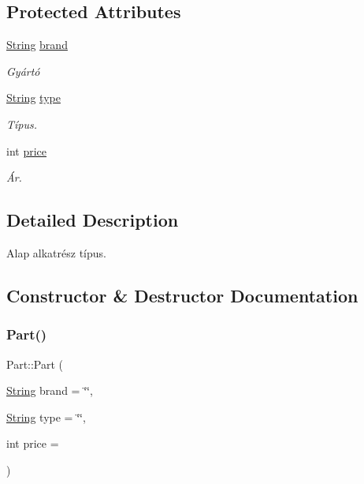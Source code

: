 \subsection*{Protected Attributes}
\begin{DoxyCompactItemize}
\item 
\mbox{\hyperlink{class_string}{String}} \mbox{\hyperlink{class_part_ae06f2fdeb7fbbdb229a7aca151f3e341}{brand}}
\begin{DoxyCompactList}\small\item\em Gyártó \end{DoxyCompactList}\item 
\mbox{\hyperlink{class_string}{String}} \mbox{\hyperlink{class_part_a101dbcc5c4b21564df7414c7eb0eae88}{type}}
\begin{DoxyCompactList}\small\item\em Típus. \end{DoxyCompactList}\item 
int \mbox{\hyperlink{class_part_a8e71223aed1da95a974f33d8d6c91bb1}{price}}
\begin{DoxyCompactList}\small\item\em Ár. \end{DoxyCompactList}\end{DoxyCompactItemize}


\subsection{Detailed Description}
Alap alkatrész típus. 

\subsection{Constructor \& Destructor Documentation}
\mbox{\label{class_part_aae5224ee782134c4ecb60f23ec38698f}} 
\subsubsection{\texorpdfstring{Part()}{Part()}}
{\footnotesize\ttfamily Part\+::\+Part (\begin{DoxyParamCaption}\item[{\mbox{\hyperlink{class_string}{String}}}]{brand = {\ttfamily \char`\"{}\char`\"{}},  }\item[{\mbox{\hyperlink{class_string}{String}}}]{type = {\ttfamily \char`\"{}\char`\"{}},  }\item[{int}]{price = {} }\end{DoxyParamCaption})\hspace{0.3cm}{\ttfamily [inline]}}

